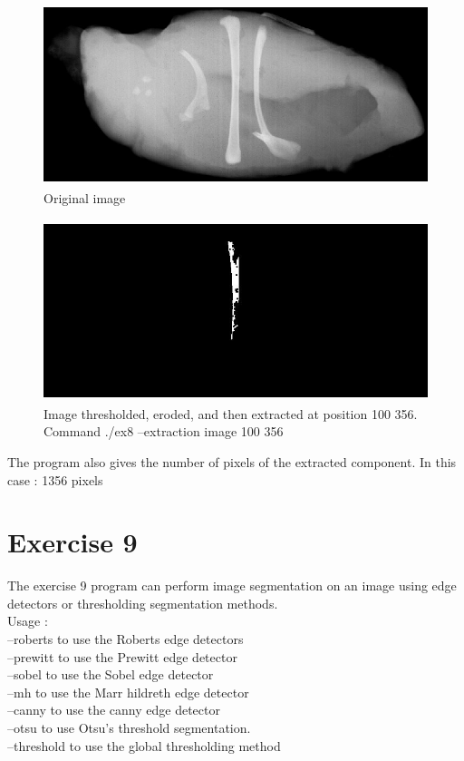 \documentclass[10pt]{article}
\begin{document}
\begin{figure}[!ht]
	\centering
	\includegraphics[height=150pt]{./ex8/chicken.jpg}
	\caption{Original image}
\end{figure}
\begin{figure}[!ht]
	\centering
	\includegraphics[height=150pt]{./ex8/chicken_extracted.jpg}
	\caption{Image thresholded, eroded, and then extracted at position 100 356. Command ./ex8 --extraction image 100 356}
\end{figure}
\clearpage
The program also gives the number of pixels of the extracted component. In this case :  1356 pixels
\clearpage
\section{Exercise 9}
The exercise 9 program can perform image segmentation on an image using edge detectors or thresholding segmentation methods.\\

Usage : \\
--roberts to use the Roberts edge detectors\\
--prewitt to use the Prewitt edge detector\\
--sobel to use the Sobel edge detector\\
--mh to use the Marr hildreth edge detector\\
--canny to use the canny edge detector\\

--otsu to use Otsu's threshold segmentation.\\
--threshold to use the global thresholding method
\end{document}
